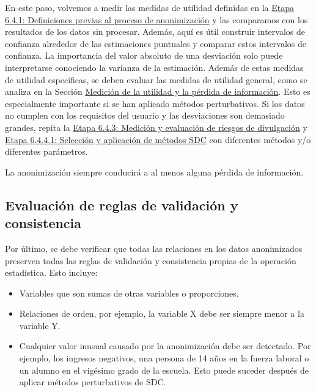 \documentclass[]{book}
\providecommand{\tightlist}{%
  \setlength{\itemsep}{0pt}\setlength{\parskip}{0pt}}
\theoremstyle{definition}
\theoremstyle{definition}
\theoremstyle{definition}
\theoremstyle{definition}
\theoremstyle{remark}
\begin{document}
En este paso, volvemos a medir las medidas de utilidad definidas en la \protect\hyperlink{etapa-6.4.1-definiciones-previas-al-proceso-de-anonimizaciuxf3n}{Etapa 6.4.1: Definiciones previas al proceso de anonimización} y las comparamos con los resultados de los datos sin procesar. Además, aquí es útil construir intervalos de confianza alrededor de las estimaciones puntuales y comparar estos intervalos de confianza. La importancia del valor absoluto de una desviación solo puede interpretarse conociendo la varianza de la estimación. Además de estas medidas de utilidad específicas, se deben evaluar las medidas de utilidad general, como se analiza en la Sección \protect\hyperlink{mediciuxf3n-de-la-utilidad-y-la-puxe9rdida-de-informaciuxf3n}{Medición de la utilidad y la pérdida de información}. Esto es especialmente importante si se han aplicado métodos perturbativos. Si los datos no cumplen con los requisitos del usuario y las desviaciones son demasiado grandes, repita la \protect\hyperlink{etapa-6.4.3-mediciuxf3n-y-evaluaciuxf3n-de-riesgos-de-divulgaciuxf3n}{Etapa 6.4.3: Medición y evaluación de riesgos de divulgación} y \protect\hyperlink{etapa-6.4.4.1-selecciuxf3n-y-aplicaciuxf3n-de-muxe9todos-sdc}{Etapa 6.4.4.1: Selección y aplicación de métodos SDC} con diferentes métodos y/o diferentes parámetros.

La anonimización siempre conducirá a al menos alguna pérdida de información.

\hypertarget{evaluaciuxf3n-de-reglas-de-validaciuxf3n-y-consistencia}{%
\subsection{Evaluación de reglas de validación y consistencia}\label{evaluaciuxf3n-de-reglas-de-validaciuxf3n-y-consistencia}}

Por último, se debe verificar que todas las relaciones en los datos anonimizados preserven todas las reglas de validación y consistencia propias de la operación estadística. Esto incluye:

\begin{itemize}
\tightlist
\item
  Variables que son sumas de otras variables o proporciones.
\item
  Relaciones de orden, por ejemplo, la variable X debe ser siempre menor a la variable Y.
\item
  Cualquier valor inusual causado por la anonimización debe ser detectado. Por ejemplo, los ingresos negativos, una persona de 14 años en la fuerza laboral o un alumno en el vigésimo grado de la escuela. Esto puede suceder después de aplicar métodos perturbativos de SDC.
\end{itemize}
\end{document}
